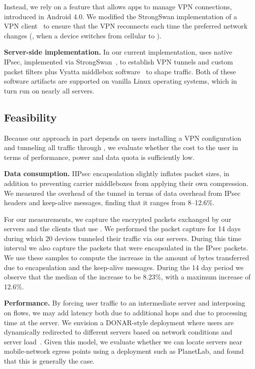 Instead, we rely on a feature that allows apps to manage VPN connections, 
introduced in Android 4.0. We modified the StrongSwan implementation of 
a VPN client~\cite{strongswanclient} to ensure that the VPN reconnects each time the preferred 
network changes (\eg, when a device switches from cellular to \wifi). 

\noindent\textbf{Server-side implementation.} In our current implementation, \meddle 
uses native IPsec, implemented via StrongSwan~\cite{strongswan}, to establish VPN tunnels 
and custom packet filters plus Vyatta middlebox software~\cite{vyatta} to shape
traffic. Both of these software artifacts are supported on vanilla
Linux operating systems, which in turn run on nearly all servers. 
   
\subsection{Feasibility}
\label{subsec:cost}
Because our approach in part depends on users installing a VPN configuration and tunneling all traffic through \meddle, we evaluate whether the cost to the user in terms of performance, power and data quota is sufficiently low.
  
\noindent\textbf{Data consumption.} IIPsec encapsulation slightly inflates packet sizes, in addition to 
preventing carrier middleboxes from applying their own compression. We measured the overhead 
of the tunnel in terms of data overhead from IPsec headers and keep-alive messages, finding that it 
ranges from 8--12.6\%. 

For our measurements, we capture the encrypted packets exchanged by 
our \meddle servers and the clients that use \meddle. We performed the packet capture for 14 days 
during which 20 devices tunneled their traffic via our \meddle servers. During this time interval we 
also capture the packets that were encapsulated in the IPsec packets. We use these samples to 
compute the increase in the amount of bytes transferred due to encapsulation and the keep-alive 
messages. During the 14 day period we observe that the median of the increase to be 8.23\%, 
with a maximum increase of 12.6\%.

\noindent\textbf{Performance.} By forcing user traffic to an
intermediate server and interposing on flows, we may add latency both
due to additional hops and due to processing time at the \meddle
server. We envision a DONAR-style deployment where users are
dynamically redirected to different \meddle servers based on network
conditions and server load~\cite{wendell:donar}. Given this model, we
evaluate whether we can locate servers near mobile-network egress
points using a deployment such as PlanetLab, and found that this is
generally the case.

